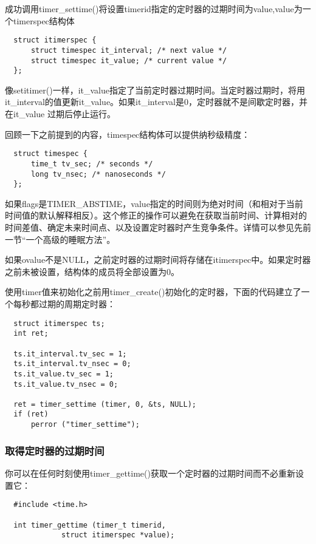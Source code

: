 成功调用timer\_settime()将设置timerid指定的定时器的过期时间为value,value为一个timerspec结构体 

\begin{lstlisting}
  struct itimerspec {
      struct timespec it_interval; /* next value */
      struct timespec it_value; /* current value */
  };
\end{lstlisting}

像setitimer()一样，it\_value指定了当前定时器过期时间。当定时器过期时，将用it\_interval的值更新it\_value。如果it\_interval是0，定时器就不是间歇定时器，并在it\_value 过期后停止运行。

回顾一下之前提到的内容，timespec结构体可以提供纳秒级精度：

\begin{lstlisting}
  struct timespec {
      time_t tv_sec; /* seconds */
      long tv_nsec; /* nanoseconds */
  };
\end{lstlisting}

如果flags是TIMER\_ABSTIME，value指定的时间则为绝对时间（和相对于当前时间值的默认解释相反）。这个修正的操作可以避免在获取当前时间、计算相对的时间差值、确定未来时间点、以及设置定时器时产生竞争条件。详情可以参见先前一节“一个高级的睡眠方法”。 

如果ovalue不是NULL，之前定时器的过期时间将存储在itimerspec中。如果定时器之前未被设置，结构体的成员将全部设置为0。 

使用timer值来初始化之前用timer\_create()初始化的定时器，下面的代码建立了一个每秒都过期的周期定时器： 

\begin{lstlisting}
  struct itimerspec ts;
  int ret;

  ts.it_interval.tv_sec = 1;
  ts.it_interval.tv_nsec = 0;
  ts.it_value.tv_sec = 1;
  ts.it_value.tv_nsec = 0;

  ret = timer_settime (timer, 0, &ts, NULL);
  if (ret)
      perror ("timer_settime");
\end{lstlisting}

\subsubsection{取得定时器的过期时间}

你可以在任何时刻使用timer\_gettime()获取一个定时器的过期时间而不必重新设置它： 

\begin{lstlisting}
  #include <time.h>

  int timer_gettime (timer_t timerid,
		     struct itimerspec *value);
\end{lstlisting}

